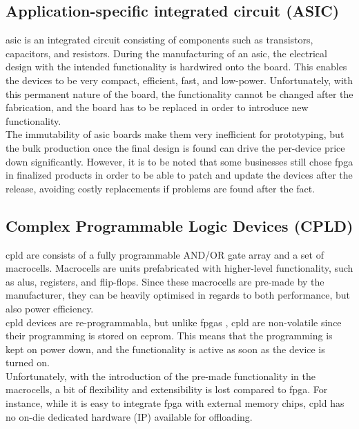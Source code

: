 \subsection{Application-specific integrated circuit (ASIC)}
\gls{asic} is an integrated circuit consisting of components such as
transistors, capacitors, and resistors. During the manufacturing of an
\gls{asic}, the electrical design with the intended functionality is hardwired
onto the board. This enables the devices to be very compact, efficient, fast,
and low-power. Unfortunately, with this permanent nature of the board, the
functionality cannot be changed after the fabrication, and the board has to be
replaced in order to introduce new functionality\cite{fpga_for_dummies}.\\
The immutability of \gls{asic} boards make them very inefficient for
prototyping, but the bulk production once the final design is found can drive
the per-device price down significantly. However, it is to be noted that
some businesses still chose \gls{fpga} in finalized products in order to be
able to patch and update the devices after the release, avoiding costly
replacements if problems are found after the fact.\cite{fpga_for_dummies}


\subsection{Complex Programmable Logic Devices (CPLD)}
\gls{cpld} are consists of a fully programmable AND/OR gate array and a set of
macrocells. Macrocells are units prefabricated with higher-level functionality,
such as \gls{alu}s, registers, and flip-flops. Since these macrocells are
pre-made by the manufacturer, they can be heavily optimised in regards to both
performance, but also power efficiency.\cite{xilinx_cpld}\\
\gls{cpld} devices are re-programmabla, but unlike \gls{fpga}s
, \gls{cpld} are
non-volatile since their programming is stored on \gls{eeprom}. This means that
the programming is kept on power down, and the functionality is active as soon
as the device is turned on\cite{xilinx_cpld}.\\
Unfortunately, with the introduction of the pre-made functionality in the
macrocells, a bit of flexibility and extensibility is lost compared to
\gls{fpga}. For instance, while it is easy to integrate \gls{fpga} with
external memory chips, \gls{cpld} has no on-die dedicated hardware (IP)
available for offloading\cite{numatolab_cpld_vs_fpga}.

